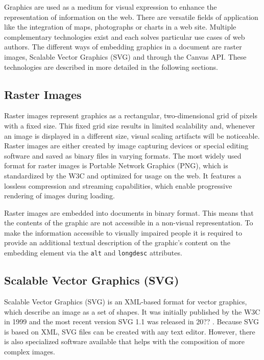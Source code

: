 Graphics are used as a medium for visual expression to enhance the representation of information on the web. There are versatile fields of application like the integration of maps, photographs or charts in a web site. Multiple complementary technologies exist and each solves particular use cases of web authors. The different ways of embedding graphics in a document are raster images, Scalable Vector Graphics (SVG) and through the Canvas API. These technologies are described in more detailed in the following sections. 

\subsection{Raster Images}

Raster images represent graphics as a rectangular, two-dimensional grid of pixels with a fixed size. This fixed grid size results in limited scalability and, whenever an image is displayed in a different size, visual scaling artifacts will be noticeable. Raster images are either created by image capturing devices or special editing software and saved as binary files in varying formats. The most widely used format for raster images is Portable Network Graphics (PNG), which is standardized by the W3C \parencite{PNG} and optimized for usage on the web. It features a lossless compression and streaming capabilities, which enable progressive rendering of images during loading. 

Raster images are embedded into documents in binary format. This means that the contents of the graphic are not accessible in a non-visual representation. To make the information accessible to visually impaired people it is required to provide an additional textual description of the graphic's content on the embedding element via the \lstinline{alt} and \lstinline{longdesc} attributes.

\subsection{Scalable Vector Graphics (SVG)}

Scalable Vector Graphics (SVG) is an XML-based format for vector graphics, which describe an image as a set of shapes. It was initially published by the W3C in 1999 \parencite{SVG1.0} and the most recent version SVG 1.1 was released in 20?? \parencite{SVG1.1}. Because SVG is based on XML, SVG files can be created with any text editor. However, there is also specialized software available that helps with the composition of more complex images.

